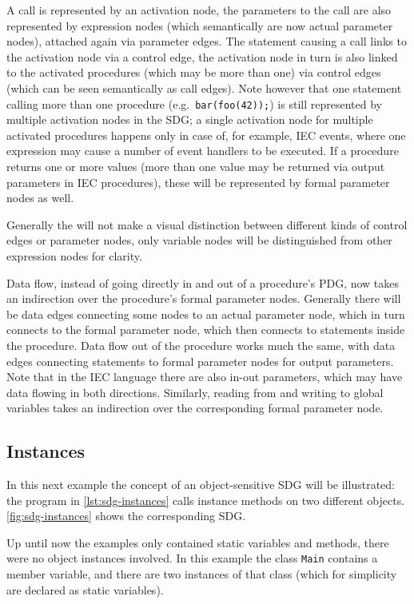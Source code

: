 A call is represented by an activation node, the parameters to the call are also represented by expression nodes (which 
semantically are now actual parameter nodes), attached again via parameter edges. The statement causing a call links to 
the activation node via a control edge, the activation node in turn is also linked to the activated procedures (which 
may be more than one) via control edges (which can be seen semantically as call edges). Note however that one statement 
calling more than one procedure (e.g.\ \lstinline|bar(foo(42));|) is still represented by multiple activation nodes in 
the SDG; a single activation node for multiple activated procedures happens only in case of, for example, IEC events, 
where one expression may cause a number of event handlers to be executed. If a procedure returns one or more values 
(more than one value may be returned via output parameters in IEC procedures), these will be represented by formal 
parameter nodes as well.

Generally the \SB will not make a visual distinction between different kinds of control edges or parameter nodes, only 
variable nodes will be distinguished from other expression nodes for clarity.

Data flow, instead of going directly in and out of a procedure's PDG, now takes an indirection over the procedure's 
formal parameter nodes. Generally there will be data edges connecting some nodes to an actual parameter node, which in 
turn connects to the formal parameter node, which then connects to statements inside the procedure. Data flow out of 
the procedure works much the same, with data edges connecting statements to formal parameter nodes for output 
parameters. Note that in the IEC language there are also in-out parameters, which may have data flowing in both 
directions. Similarly, reading from and writing to global variables takes an indirection over the corresponding formal 
parameter node.



\subsection{Instances}

In this next example the concept of an object-sensitive SDG will be illustrated: the program in 
\autoref{lst:sdg-instances} calls instance methods on two different objects. \autoref{fig:sdg-instances} shows the 
corresponding SDG.

Up until now the examples only contained static variables and methods, there were no object instances involved. In this 
example the class \lstinline|Main| contains a member variable, and there are two instances of that class (which for 
simplicity are declared as static variables).

